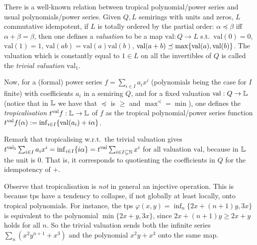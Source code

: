 \begin{remark}\label{rmk:val_trop}
 There is a well-known relation between tropical polynomial/power series and usual polynomials/power series. 
Given $Q,L$ semirings with units and zeros, $L$ commutative idempotent, if $L$ is totally ordered by the partial order: $\alpha \preceq \beta$ iff $\alpha +  \beta = \beta$, then one defines a \emph{valuation} \cite{Izhakian2015} to be a map $\mathrm{val}:Q\to L$ s.t.\ $\mathrm{val}(0)=0$, $\mathrm{val}(1)=1$, $\mathrm{val}(ab)=\mathrm{val}(a)\mathrm{val}(b)$, $\mathrm{val}(a+b)\preceq \max\{\mathrm{val}(a),\mathrm{val}(b)\}$.
The valuation which is constantly equal to $1\in L$ on all the invertibles of $Q$ is called the \emph{trivial valuation} $\mathrm{val}_1$.

Now, for a (formal) power series $f=\sum_{i\in I} a_i x^i$ (polynomials being the case for $I$ finite) with coefficients $a_i$ in a semiring $Q$, and for a fixed valuation $\mathrm{val}:Q\to \mathbb{L}$ (notice that in $\mathbb{L}$ we have that $\preceq$ is $\geq$ and $\max^{\preceq}=\min$), one defines the \emph{tropicalisation} $\trop^{\mathrm{val}}f:\Lawv \to \Lawv$ of $f$ as the tropical polynomial/power series function $\trop^{\mathrm{val}}f(\alpha):=\inf_{i\in I} \set{\mathrm{val}(a_i)+i\alpha}$.

Remark that tropicalising w.r.t.\ the trivial valuation gives $\trop^{\mathrm{val}_1} \sum_{i\in I} a_i x^i = \inf_{i\in I} \set{i\alpha} = \trop^{\mathrm{val}} \sum_{i\in I\subseteq\N} x^i$ for all valuation $\mathrm{val}$, because in $\mathbb{L}$ the unit is $0$. %
That is, it corresponds to quotienting the coefficients in $Q$ for the idempotency of $+$.
\end{remark}

Observe that tropicalisation is \emph{not} in general an injective operation. 
This is because tps have a tendency to collapse, if not globally at least locally, onto tropical polynomials. For instance, the tps $\varphi(x,y)=\inf_{n}\{2x+(n+1)y,3x\}$ is  equivalent to the polynomial $\min\{2x+y,3x\}$, since $2x+(n+1)y\geq 2x+y$ holds for all $n$. So the trivial valuation sends both the infinite series $\sum_{n}(x^{2}y^{n+1}+x^{3})$ and the polynomial $x^{2}y+x^{3}$ onto the same map.


